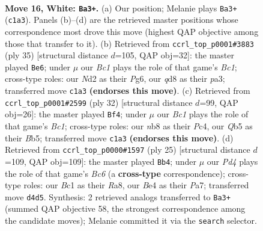 \documentclass[11pt]{article}
\begin{document}
\clearpage

\begin{figure}[p]\centering
\begin{subfigure}{0.46\textwidth}\centering
\resizebox{\linewidth}{!}{%
\newchessgame
\chessboard[
  setfen={rnbq1k1r/1p4b1/4p3/pQ4pp/3PB3/8/P2N1PPP/R1B2RK1 w - - 2 16},
  showmover=false,
  pgfstyle=straightmove, color=movearrow, markmove={c1-a3}
]}
\caption{}
\end{subfigure}\hfill
\begin{subfigure}{0.46\textwidth}\centering
\resizebox{\linewidth}{!}{%
\newchessgame
\chessboard[
  setfen={r1b2rk1/pp3pbp/6p1/4P3/4BB2/P1q5/5PPP/R2QR1K1 b - - 1 18},
  showmover=false,
  pgfstyle=straightmove, color=movearrow, markmove={c8-e6}
]}
\caption{}
\end{subfigure}
\\[4pt]
\begin{subfigure}{0.46\textwidth}\centering
\resizebox{\linewidth}{!}{%
\newchessgame
\chessboard[
  setfen={rn1q1k1r/1p1b4/p3pbQ1/1B5p/2P5/8/PP3PPP/R1B2RK1 w - - 1 17},
  showmover=false,
  pgfstyle=straightmove, color=movearrow, markmove={c1-f4}
]}
\caption{}
\end{subfigure}\hfill
\begin{subfigure}{0.46\textwidth}\centering
\resizebox{\linewidth}{!}{%
\newchessgame
\chessboard[
  setfen={r1b2rk1/pp1n1ppp/8/q1PQ2B1/2B5/2b1PN2/P4PPP/2RK3R b - - 3 13},
  showmover=false,
  pgfstyle=straightmove, color=movearrow, markmove={c3-b4}
]}
\caption{}
\end{subfigure}
\caption{\textbf{Move 16, White: \texttt{Ba3+}.} (a) Our position; Melanie plays \texttt{Ba3+} (\texttt{c1a3}). Panels (b)--(d) are the retrieved master positions whose correspondence most drove this move (highest QAP objective among those that transfer to it). (b) Retrieved from \texttt{ccrl\_top\_p0001\#3883} (ply 35) [structural distance $d$=105, QAP obj=32]: the master played \texttt{Be6}; under $\mu$ our \emph{Bc1} plays the role of that game's \emph{Bc1}; cross-type roles: our \emph{N}d2 as their \emph{P}g6, our \emph{q}d8 as their \emph{p}a3; transferred move \texttt{c1a3} \textbf{(endorses this move)}. (c) Retrieved from \texttt{ccrl\_top\_p0001\#2599} (ply 32) [structural distance $d$=99, QAP obj=26]: the master played \texttt{Bf4}; under $\mu$ our \emph{Bc1} plays the role of that game's \emph{Bc1}; cross-type roles: our \emph{n}b8 as their \emph{P}c4, our \emph{Q}b5 as their \emph{B}b5; transferred move \texttt{c1a3} \textbf{(endorses this move)}. (d) Retrieved from \texttt{ccrl\_top\_p0000\#1597} (ply 25) [structural distance $d$=109, QAP obj=109]: the master played \texttt{Bb4}; under $\mu$ our \emph{Pd4} plays the role of that game's \emph{Bc6} (a \textbf{cross-type} correspondence); cross-type roles: our \emph{B}c1 as their \emph{R}a8, our \emph{B}e4 as their \emph{P}a7; transferred move \texttt{d4d5}. Synthesis: 2 retrieved analogs transferred to \texttt{Ba3+} (summed QAP objective 58, the strongest correspondence among the candidate moves); Melanie committed it via the \texttt{search} selector.}
\label{fig:thought-m30}
\end{figure}
\end{document}
